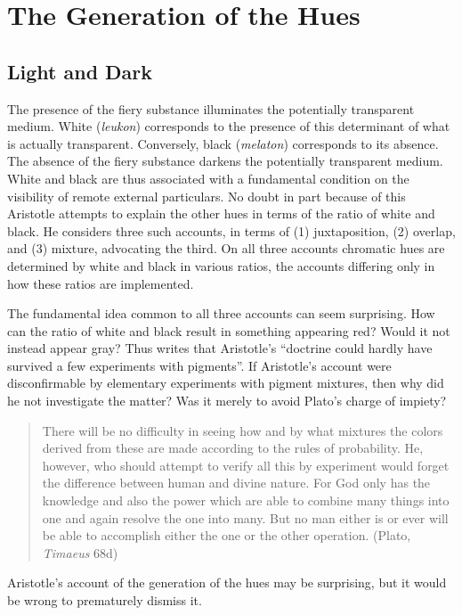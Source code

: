 \chapter{The Generation of the Hues} %
\label{cha:the_generation_of_the_hues}

\section{Light and Dark} %
\label{sec:introduction}
The presence of the fiery substance illuminates the potentially transparent me\-di\-um. White (\emph{leukon}) corresponds to the presence of this determinant of what is actually transparent. Conversely, black (\emph{melaton}) corresponds to its absence. The absence of the fiery substance darkens the potentially transparent medium. White and black are thus associated with a fundamental condition on the visibility of remote external particulars. No doubt in part because of this Aristotle attempts to explain the other hues in terms of the ratio of white and black. He considers three such accounts, in terms of (1) juxtaposition, (2) overlap, and (3) mixture, advocating the third. On all three accounts chromatic hues are determined by white and black in various ratios, the accounts differing only in how these ratios are implemented. 

The fundamental idea common to all three accounts can seem surprising. How can the ratio of white and black result in something appearing red? Would it not instead appear gray? Thus \citet[210]{Hett:1936fk} writes that Aristotle's ``doctrine could hardly have survived a few experiments with pigments''. If Aristotle's account were disconfirmable by elementary experiments with pigment mixtures, then why did he not investigate the matter? Was it merely to avoid Plato's charge of impiety?
\begin{quote}
    There will be no difficulty in seeing how and by what mixtures the colors derived from these are made according to the rules of probability. He, however, who should attempt to verify all this by experiment would forget the difference between human and divine nature. For God only has the knowledge and also the power which are able to combine many things into one and again resolve the one into many. But no man either is or ever will be able to accomplish either the one or the other operation. (Plato, \emph{Timaeus} 68d)
\end{quote}
Aristotle's account of the generation of the hues may be surprising, but it would be wrong to prematurely dismiss it. 

